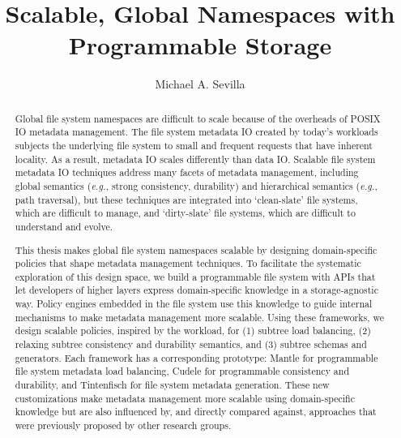 \title{Scalable, Global Namespaces with Programmable Storage}
\author{Michael A. Sevilla}
\deanlinethree{}

\begin{frontmatter}
	\maketitle\copyrightpage\tableofcontents\listoffigures\listoftables
	\begin{abstract}

Global file system namespaces are difficult to scale because of the overheads
of POSIX IO metadata management. The file system metadata IO created by today's
workloads subjects the underlying file system to small and frequent requests
that have inherent locality. As a result, metadata IO scales differently than
data IO.  Scalable file system metadata IO techniques address many
facets of metadata management, including global semantics ({\it e.g.}, strong
consistency, durability) and hierarchical semantics ({\it e.g.}, path
traversal), but these techniques are integrated into `clean-slate' file
systems, which are difficult to manage, and `dirty-slate' file systems, which
are difficult to understand and evolve.  

This thesis makes global file system namespaces scalable by designing
domain-specific policies that shape metadata management techniques.  To
facilitate the systematic exploration of this design space, we build a
programmable file system with APIs that let developers of higher layers
express domain-specific knowledge in a storage-agnostic way. Policy
engines embedded in the file system use this knowledge to guide internal
mechanisms to make metadata management more scalable.  Using these frameworks,
we design scalable policies, inspired by the workload, for (1) subtree load
balancing, (2) relaxing subtree consistency and durability semantics, and (3)
subtree schemas and generators. Each framework has a corresponding prototype:
Mantle for programmable file system metadata load balancing, Cudele for
programmable consistency and durability, and Tintenfisch for file system
metadata generation. These new customizations make metadata management more
scalable using domain-specific knowledge but are also influenced by, and
directly compared against, approaches that were previously proposed by other
research groups.


\end{abstract}
\end{frontmatter}
